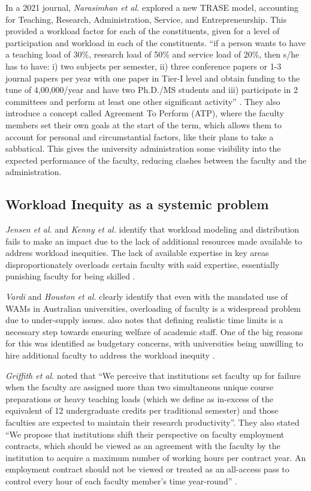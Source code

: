 In a 2021 journal, \textit{Narasimhan et al.} explored a new TRASE model, accounting for Teaching, Research, Administration, Service, and Entrepreneurship. This provided a workload factor for each of the constituents, given for a level of participation and workload in each of the constituents. ``if a person wants to have a teaching load of 30\%, research load of 50\% and service load of 20\%, then s/he has to have: i) two subjects per semester, ii) three conference papers or 1-3 journal papers per year with one paper in Tier-I level and obtain funding to the tune of 4,00,000/year and have two Ph.D./MS students and iii) participate in 2 committees and perform at least one other significant activity'' \cite{narasimhan32trase}. They also introduce a concept called Agreement To Perform (ATP), where the faculty members set their own goals at the start of the term, which allows them to account for personal and circumstantial factors, like their plans to take a sabbatical. This gives the university administration some visibility into the expected performance of the faculty, reducing clashes between the faculty and the administration.

\subsection{Workload Inequity as a systemic problem}

\textit{Jensen et al.} \cite{jensen2009overload} and \textit{Kenny et al.} identify that workload modeling and distribution fails to make an impact due to the lack of additional resources made available to address workload inequities. The lack of available expertise in key areas disproportionately overloads certain faculty with said expertise, essentially punishing faculty for being skilled \cite{jensen2009overload, kenny2014effectiveness}.

\textit{Vardi} and \textit{Houston et al.} \cite{vardi2009impacts, houston2006academic} clearly identify that even with the mandated use of WAMs in Australian universities, overloading of faculty is a widespread problem due to under-supply issues.\cite{kenny2014effectiveness} also notes that defining realistic time limits is a necessary step towards ensuring welfare of academic staff. One of the big reasons for this was identified as budgetary concerns, with universities being unwilling to hire additional faculty to address the workload inequity \cite{kenny2012placing}.

\textit{Griffith et al.} noted that ``We perceive that institutions set faculty up for failure when the faculty are assigned more than two simultaneous unique course preparations or heavy teaching loads (which we define as in-excess of the equivalent of 12 undergraduate credits per traditional semester) and those faculties are expected to maintain their research productivity''. They also stated ``We propose that institutions shift their perspective on faculty employment contracts, which should be viewed as an agreement with the faculty by the institution to acquire a maximum number of working hours per contract year. An employment contract should not be viewed or treated as an all-access pass to control every hour of each faculty member's time year-round'' \cite{griffith2020framework}.

